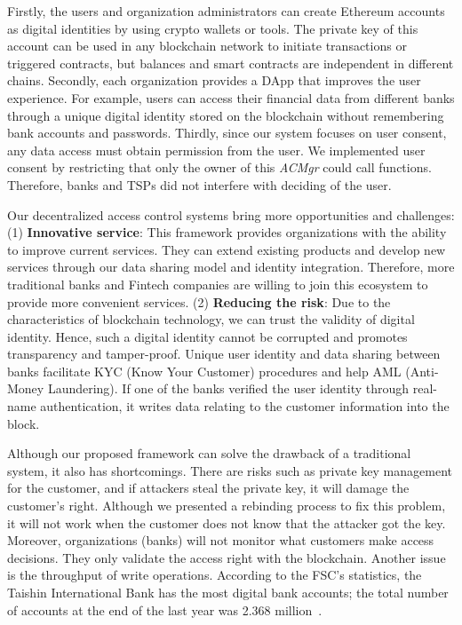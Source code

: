 Firstly, the users and organization administrators can create Ethereum accounts as digital identities by using crypto wallets or tools. The private key of this account can be used in any blockchain network to initiate transactions or triggered contracts, but balances and smart contracts are independent in different chains. Secondly, each organization provides a DApp that improves the user experience. For example, users can access their financial data from different banks through a unique digital identity stored on the blockchain without remembering bank accounts and passwords. Thirdly, since our system focuses on user consent, any data access must obtain permission from the user. We implemented user consent by restricting that only the owner of this \textit{ACMgr} could call functions. Therefore, banks and TSPs did not interfere with deciding of the user.
\par 

Our decentralized access control systems bring more opportunities and challenges: (1) \textbf{Innovative service}: This framework provides organizations with the ability to improve current services. They can extend existing products and develop new services through our data sharing model and identity integration. Therefore, more traditional banks and Fintech companies are willing to join this ecosystem to provide more convenient services.  (2) \textbf{Reducing the risk}: Due to the characteristics of blockchain technology, we can trust the validity of digital identity. Hence, such a digital identity cannot be corrupted and promotes transparency and tamper-proof. Unique user identity and data sharing between banks facilitate KYC (Know Your Customer) procedures and help AML (Anti-Money Laundering). If one of the banks verified the user identity through real-name authentication, it writes data relating to the customer information into the block.

Although our proposed framework can solve the drawback of a traditional system, it also has shortcomings. There are risks such as private key management for the customer, and if attackers steal the private key, it will damage the customer's right. Although we presented a rebinding process to fix this problem, it will not work when the customer does not know that the attacker got the key. Moreover, organizations (banks) will not monitor what customers make access decisions. They only validate the access right with the blockchain. Another issue is the throughput of write operations. According to the FSC's statistics, the Taishin International Bank has the most digital bank accounts; the total number of accounts at the end of the last year was 2.368 million~\cite{cna_2021}.